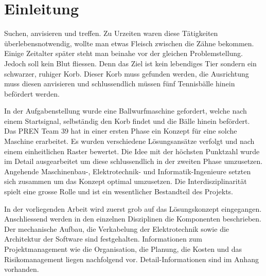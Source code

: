 \section{Einleitung}

Suchen, anvisieren und treffen. Zu Urzeiten waren diese Tätigkeiten überlebensnotwendig, wollte man etwas Fleisch zwischen die Zähne bekommen. Einige Zeitalter später steht man beinahe vor der gleichen Problemstellung. Jedoch soll kein Blut fliessen. Denn das Ziel ist kein lebendiges Tier sondern ein schwarzer, ruhiger Korb. Dieser Korb muss gefunden werden, die Ausrichtung muss diesen anvisieren und schlussendlich müssen fünf Tennisbälle hinein befördert werden.

In der Aufgabenstellung wurde eine Ballwurfmaschine gefordert, welche nach einem Startsignal, selbständig den Korb findet und die Bälle hinein befördert. Das PREN Team 39 hat in einer ersten Phase ein Konzept für eine solche Maschine erarbeitet. Es wurden verschiedene Lösungsansätze verfolgt und nach einem einheitlichen Raster bewertet. Die Idee mit der höchsten Punktzahl wurde im Detail ausgearbeitet um diese schlussendlich in der zweiten Phase umzusetzen. Angehende Maschinenbau-, Elektrotechnik- und Informatik-Ingenieure setzten sich zusammen um das Konzept optimal umzusetzen. Die Interdisziplinarität spielt eine grosse Rolle und ist ein wesentlicher Bestandteil des Projekts.

In der vorliegenden Arbeit wird zuerst grob auf das Lösungskonzept eingegangen. Anschliessend werden in den einzelnen Disziplinen die Komponenten beschrieben. Der mechanische Aufbau, die Verkabelung der Elektrotechnik sowie die Architektur der Software sind festgehalten. Informationen zum Projektmanagement wie die Organisation, die Planung, die Kosten und das Risikomanagement liegen nachfolgend vor. Detail-Informationen sind im Anhang vorhanden.


